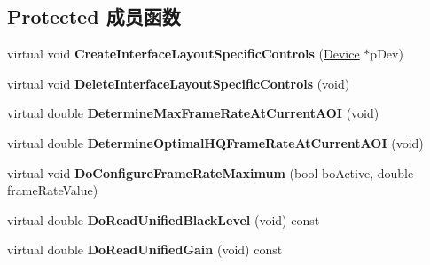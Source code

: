 \subsection*{Protected 成员函数}
\begin{DoxyCompactItemize}
\item 
\hypertarget{class_wizard_quick_setup_gen_i_cam_a2c7be69617c95c32dcaf6bae7314496f}{virtual void {\bfseries Create\+Interface\+Layout\+Specific\+Controls} (\hyperlink{classmv_i_m_p_a_c_t_1_1acquire_1_1_device}{Device} $\ast$p\+Dev)}\label{class_wizard_quick_setup_gen_i_cam_a2c7be69617c95c32dcaf6bae7314496f}

\item 
\hypertarget{class_wizard_quick_setup_gen_i_cam_aa492d91c8662e4511b8b6bf00f4335c5}{virtual void {\bfseries Delete\+Interface\+Layout\+Specific\+Controls} (void)}\label{class_wizard_quick_setup_gen_i_cam_aa492d91c8662e4511b8b6bf00f4335c5}

\item 
\hypertarget{class_wizard_quick_setup_gen_i_cam_ad042e7f3a71e6c81f40148bd3a31552c}{virtual double {\bfseries Determine\+Max\+Frame\+Rate\+At\+Current\+A\+O\+I} (void)}\label{class_wizard_quick_setup_gen_i_cam_ad042e7f3a71e6c81f40148bd3a31552c}

\item 
\hypertarget{class_wizard_quick_setup_gen_i_cam_a4ae31c0357c882d38c2dfebdb329d9eb}{virtual double {\bfseries Determine\+Optimal\+H\+Q\+Frame\+Rate\+At\+Current\+A\+O\+I} (void)}\label{class_wizard_quick_setup_gen_i_cam_a4ae31c0357c882d38c2dfebdb329d9eb}

\item 
\hypertarget{class_wizard_quick_setup_gen_i_cam_a8a1f95d99f588d923029f656b1489a9c}{virtual void {\bfseries Do\+Configure\+Frame\+Rate\+Maximum} (bool bo\+Active, double frame\+Rate\+Value)}\label{class_wizard_quick_setup_gen_i_cam_a8a1f95d99f588d923029f656b1489a9c}

\item 
\hypertarget{class_wizard_quick_setup_gen_i_cam_a843c294d3e65c721467f3c55810e102e}{virtual double {\bfseries Do\+Read\+Unified\+Black\+Level} (void) const }\label{class_wizard_quick_setup_gen_i_cam_a843c294d3e65c721467f3c55810e102e}

\item 
\hypertarget{class_wizard_quick_setup_gen_i_cam_a71c42f0f7788a37d142fe8f289a84fc6}{virtual double {\bfseries Do\+Read\+Unified\+Gain} (void) const }\label{class_wizard_quick_setup_gen_i_cam_a71c42f0f7788a37d142fe8f289a84fc6}


\end{DoxyCompactItemize}
